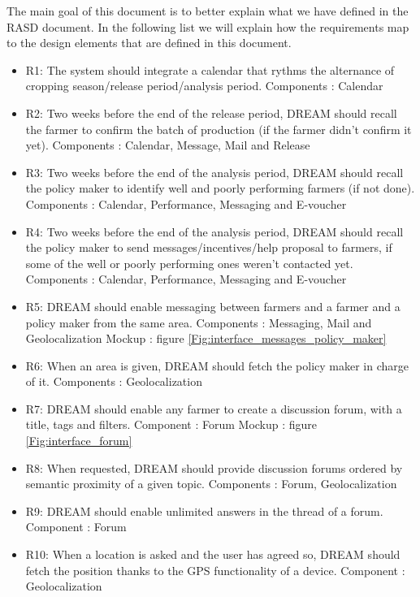 The main goal of this document is to better explain what we have defined in the RASD document. In the following list we will explain how the requirements map to the design elements that are defined in this document.

\begin{itemize}
	\item
	R1: The system should integrate a calendar that rythms the alternance of cropping season/release period/analysis period.
	\subitem Components : Calendar 
	\item
	R2: Two weeks before the end of the release period, DREAM should recall the farmer to confirm the batch of production (if the farmer didn't confirm it yet).
	\subitem Components : Calendar, Message, Mail and Release
	\item
	R3: Two weeks before the end of the analysis period, DREAM should recall the policy maker to identify well and poorly performing farmers (if not done).
	\subitem Components : Calendar, Performance, Messaging and E-voucher
	\item
	R4: Two weeks before the end of the analysis period, DREAM should recall the policy maker to send messages/incentives/help proposal to farmers, if some of the well or poorly performing ones weren't contacted yet.
	\subitem Components : Calendar, Performance, Messaging and E-voucher
	\item
	R5: DREAM should enable messaging between farmers and a farmer and a policy maker from the same area.
	\subitem Components : Messaging, Mail and Geolocalization
	\subitem Mockup : figure \ref{Fig:interface_messages_policy_maker}
	\item
	R6: When an area is given, DREAM should fetch the policy maker in charge of it.
	\subitem Components : Geolocalization
	\item
	R7: DREAM should enable any farmer to create a discussion forum, with a title, tags and filters.
	\subitem Component : Forum
	\subitem Mockup : figure \ref{Fig:interface_forum}
	\item
	R8: When requested, DREAM should provide discussion forums ordered by semantic proximity of a given topic.
	\subitem Components : Forum, Geolocalization 
	\item
	R9: DREAM should enable unlimited answers in the thread of a forum.
	\subitem Component : Forum
	\item
	R10: When a location is asked and the user has agreed so, DREAM should fetch the position thanks to the GPS functionality of a device.
	\subitem Component : Geolocalization

\end{itemize}
